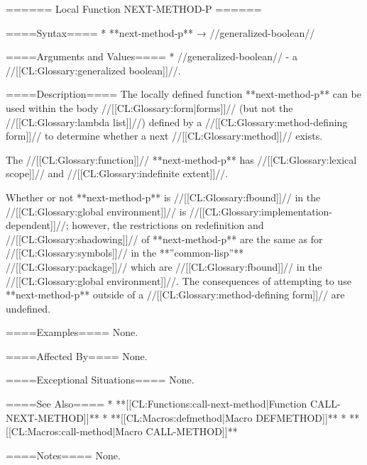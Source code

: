 ====== Local Function NEXT-METHOD-P ======

====Syntax====
  * **next-method-p** → //generalized-boolean//

====Arguments and Values====
  * //generalized-boolean// - a //[[CL:Glossary:generalized boolean]]//.

====Description====
The locally defined function **next-method-p** can be used within the body //[[CL:Glossary:form|forms]]// (but not the //[[CL:Glossary:lambda list]]//) defined by a //[[CL:Glossary:method-defining form]]// to determine whether a next //[[CL:Glossary:method]]// exists.

The //[[CL:Glossary:function]]// **next-method-p** has //[[CL:Glossary:lexical scope]]// and //[[CL:Glossary:indefinite extent]]//.

Whether or not **next-method-p** is //[[CL:Glossary:fbound]]// in the //[[CL:Glossary:global environment]]// is //[[CL:Glossary:implementation-dependent]]//; however, the restrictions on redefinition and //[[CL:Glossary:shadowing]]// of **next-method-p** are the same as for //[[CL:Glossary:symbols]]// in the **''common-lisp''** //[[CL:Glossary:package]]// which are //[[CL:Glossary:fbound]]// in the //[[CL:Glossary:global environment]]//. The consequences of attempting to use **next-method-p** outside of a //[[CL:Glossary:method-defining form]]// are undefined.

====Examples====
None.

====Affected By====
None.

====Exceptional Situations====
None.

====See Also====
  * **[[CL:Functions:call-next-method|Function CALL-NEXT-METHOD]]**
  * **[[CL:Macros:defmethod|Macro DEFMETHOD]]**
  * **[[CL:Macros:call-method|Macro CALL-METHOD]]**

====Notes====
None.

 
